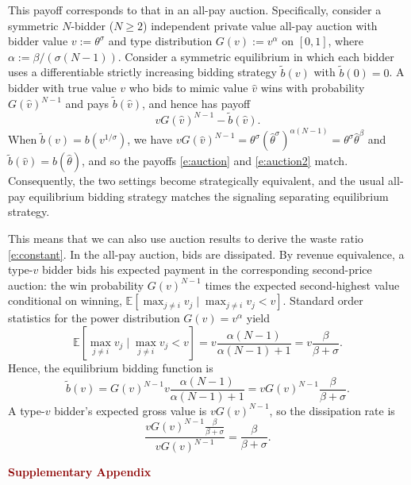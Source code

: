 \documentclass[12 pt]{article}
\theoremstyle{remark}
\theoremstyle{definition}
\newcommand{\E}{\mathbb{E}}
\begin{document}
This payoff corresponds to that in an all-pay auction. Specifically, consider a symmetric $N$-bidder ($N\geq 2$) independent private value all-pay auction with bidder value $v:=\theta^\sigma$ and type distribution $G(v):=v^\alpha$ on $[0,1]$, where $\alpha:=\beta/(\sigma(N-1))$. Consider a symmetric equilibrium in which each bidder uses a differentiable strictly increasing bidding strategy $\tilde b(v)$ with $\tilde b(0)=0$.  A bidder with true value $v$ who bids to mimic value $\hat v$ wins with probability  $G(\hat v)^{N-1}$ and pays $\tilde b(\hat v)$, and hence has payoff 
\begin{equation}
\label{e:auction2}
v G(\hat v)^{N-1} - \tilde b(\hat v).
\end{equation}
When $\tilde b (v)=b(v^{1/\sigma})$, we have $vG(\hat v)^{N-1}=\theta^\sigma (\hat{ \theta}^{\sigma})^ {\alpha (N-1)} = \theta^\sigma \hat{\theta}^\beta$ and $\tilde b(\hat v) = b(\hat \theta)$, and so the payoffs \eqref{e:auction} and \eqref{e:auction2} match. Consequently, the two settings become strategically equivalent, and the usual all-pay equilibrium bidding strategy matches the signaling separating equilibrium strategy.

This means that we can also use auction results to derive the waste ratio \eqref{e:constant}. In the all-pay auction, bids are dissipated. By revenue equivalence, a type-$v$ bidder bids his expected payment in the corresponding second-price auction: the win probability $G(v)^{N-1}$ times the expected second-highest value conditional on winning, $\E \left[\max_{j \ne i} v_j \mid \max_{j \ne i} v_j < v\right]$. Standard order statistics for the power distribution $G(v)=v^\alpha$ yield 
\[\E \left[\max_{j \ne i} v_j \mid \max_{j \ne i} v_j < v\right] =  v \frac{\alpha (N-1)}{\alpha (N-1) + 1} = v \frac{\beta}{\beta+\sigma}.\]
Hence, the equilibrium bidding function is $$\tilde b(v) = G(v)^{N-1}  v \frac{\alpha (N-1)}{\alpha (N-1) + 1} = v G(v)^{N-1}    \frac{\beta}{\beta+\sigma}.$$
A type-$v$ bidder's expected gross value is $v G(v)^{N-1}$, so the dissipation rate is
\[
\frac{ v G(v)^{N-1}    \frac{\beta}{\beta+\sigma}
}{ v G(v)^{N-1}} = \frac{\beta}{\beta+\sigma}.
\]


\newpage




\newpage

\begin{center}
\textbf{{\LARGE \textcolor{DarkRed}{Supplementary Appendix}}}
\end{center}
\end{document}

